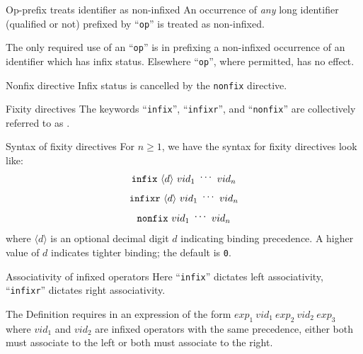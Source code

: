 \begin{clause}{Op-prefix treats identifier as non-infixed}
An occurrence of \emph{any} long identifier (qualified or not) prefixed
by ``\texttt{op}'' is treated as non-infixed.

The only required use of an ``\texttt{op}'' is in prefixing a
non-infixed occurrence of an identifier \nonterminal{\vid} which has infix
status. Elsewhere ``\texttt{op}'', where permitted, has no effect.
\end{clause}

\begin{definition}{Nonfix directive}
Infix status is cancelled by the \texttt{nonfix} directive.
\end{definition}

\begin{definition}{Fixity directives}
The keywords ``\texttt{infix}'', ``\texttt{infixr}'', and ``\texttt{nonfix}''
are collectively referred to as .
\end{definition}

\begin{clause}{Syntax of fixity directives}
For $n\geq1$, we have the syntax for fixity directives look like:
\[\mathtt{infix}\ \langle d\rangle\ vid_{1}\ \syndots\ vid_{n}\]
\[\mathtt{infixr}\ \langle d\rangle\ vid_{1}\ \syndots\ vid_{n}\]
\[\mathtt{nonfix}\ vid_{1}\ \syndots\ vid_{n}\]
where $\langle d\rangle$ is an optional decimal digit $d$ indicating
binding precedence. A higher value of $d$ indicates tighter binding; the
default is \texttt{0}.
\end{clause}

\begin{clause}{Associativity of infixed operators}
Here ``\texttt{infix}'' dictates left associativity, ``\texttt{infixr}''
dictates right associativity.

The Definition requires in an expression of the form
$exp_{1}~vid_{1}~exp_{2}~vid_{2}~exp_{3}$ where $vid_{1}$ and $vid_{2}$
are infixed operators with the same precedence, either both must
associate to the left or both must associate to the right.
\end{clause}

